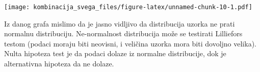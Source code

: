 \documentclass[
]{article}
\newenvironment{Shaded}{\begin{snugshade}}{\end{snugshade}}
\newcommand{\ControlFlowTok}[1]{\textcolor[rgb]{0.13,0.29,0.53}{\textbf{#1}}}
\newcommand{\FunctionTok}[1]{\textcolor[rgb]{0.00,0.00,0.00}{#1}}
\newcommand{\NormalTok}[1]{#1}
\newcommand{\OtherTok}[1]{\textcolor[rgb]{0.56,0.35,0.01}{#1}}
\newcommand{\SpecialCharTok}[1]{\textcolor[rgb]{0.00,0.00,0.00}{#1}}
\newcommand{\StringTok}[1]{\textcolor[rgb]{0.31,0.60,0.02}{#1}}
\begin{document}
\texttt{[image: kombinacija\_svega\_files/figure-latex/unnamed-chunk-10-1.pdf]}

Iz danog grafa mislimo da je jasno vidljivo da distribucija uzorka ne
prati normalnu distribuciju. Ne-normalnost distribucija može se
testirati Lilliefors testom (podaci moraju biti neovisni, i veličina
uzorka mora biti dovoljno velika). Nulta hipoteza test je da podaci
dolaze iz normalne distribucije, dok je alternativna hipoteza da ne
dolaze.

\begin{Shaded}
\end{Shaded}
\end{document}
